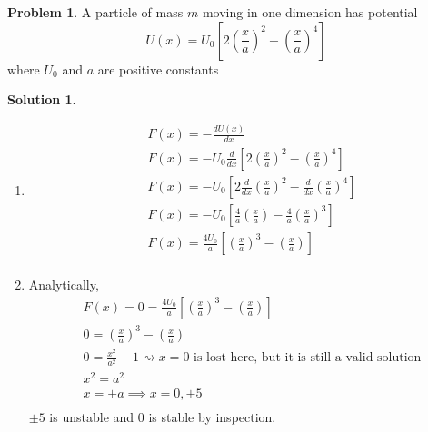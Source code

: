 \documentclass[10pt]{article}
\theoremstyle{definition}
\newtheorem{problem}{Problem}
\newtheorem{soln}{Solution}
\begin{document}
\newpage
\begin{problem}
A particle of mass $m$ moving in one dimension has potential $$U(x)=U_0\left[2\left(\frac{x}{a}\right)^2-\left(\frac{x}{a}\right)^4\right]$$ where $U_0$ and $a$ are positive constants
\end{problem}
\begin{soln} ~\\
      \begin{enumerate}[label=\alph*)]
            \item \begin{align*}
                         & F(x)=-\frac{dU(x)}{dx}                                                                               \\
                         & F(x)=-U_0\frac{d}{dx}\left[2\left(\frac{x}{a}\right)^2-\left(\frac{x}{a}\right)^4\right]             \\
                         & F(x)=-U_0\left[2\frac{d}{dx}\left(\frac{x}{a}\right)^2-\frac{d}{dx}\left(\frac{x}{a}\right)^4\right] \\
                         & F(x)=-U_0\left[\frac{4}{a}\left(\frac{x}{a}\right)-\frac{4}{a}\left(\frac{x}{a}\right)^3\right]      \\
                         & F(x)=\frac{4U_0}{a}\left[\left(\frac{x}{a}\right)^3-\left(\frac{x}{a}\right)\right]                  \\
                  \end{align*}
            \item Analytically,
                  \begin{align*}
                         & F(x)=0=\frac{4U_0}{a}\left[\left(\frac{x}{a}\right)^3-\left(\frac{x}{a}\right)\right]             \\
                         & 0 = \left(\frac{x}{a}\right)^3-\left(\frac{x}{a}\right)                                           \\
                         & 0 = \frac{x^2}{a^2}-1 \rightsquigarrow x=0 \text{ is lost here, but it is still a valid solution} \\
                         & x^2 = a^2                                                                                         \\
                         & x = \pm a \implies x=0,\pm5                                                                       \\
                  \end{align*}
                  $\pm 5$ is unstable and $0$ is stable by inspection.\\


\end{enumerate}
\end{soln}
\end{document}
